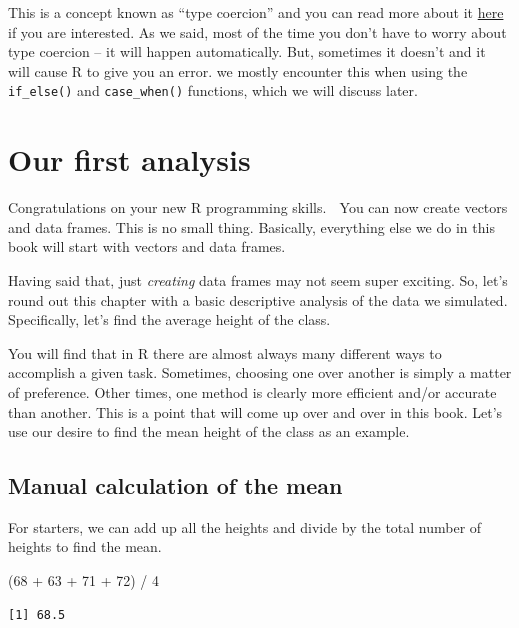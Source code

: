 \documentclass[
  letterpaper,
  DIV=11,
  numbers=noendperiod]{scrreprt}
\newenvironment{Shaded}{\begin{snugshade}}{\end{snugshade}}
\newcommand{\DecValTok}[1]{\textcolor[rgb]{0.68,0.00,0.00}{#1}}
\newcommand{\NormalTok}[1]{\textcolor[rgb]{0.00,0.23,0.31}{#1}}
\newcommand{\SpecialCharTok}[1]{\textcolor[rgb]{0.37,0.37,0.37}{#1}}
\begin{document}
This is a concept known as ``type coercion'' and you can read more about
it \href{https://r4ds.had.co.nz/vectors.html\#coercion}{here} if you are
interested. As we said, most of the time you don't have to worry about
type coercion -- it will happen automatically. But, sometimes it doesn't
and it will cause R to give you an error. we mostly encounter this when
using the \texttt{if\_else()} and \texttt{case\_when()} functions, which
we will discuss later.

\section{Our first analysis}\label{our-first-analysis}

Congratulations on your new R programming skills. 🎉 You can now create
vectors and data frames. This is no small thing. Basically, everything
else we do in this book will start with vectors and data frames.

Having said that, just \emph{creating} data frames may not seem super
exciting. So, let's round out this chapter with a basic descriptive
analysis of the data we simulated. Specifically, let's find the average
height of the class.

You will find that in R there are almost always many different ways to
accomplish a given task. Sometimes, choosing one over another is simply
a matter of preference. Other times, one method is clearly more
efficient and/or accurate than another. This is a point that will come
up over and over in this book. Let's use our desire to find the mean
height of the class as an example.

\subsection{Manual calculation of the
mean}\label{manual-calculation-of-the-mean}

For starters, we can add up all the heights and divide by the total
number of heights to find the mean.

\begin{Shaded}
\begin{Highlighting}[]
\NormalTok{(}\DecValTok{68} \SpecialCharTok{+} \DecValTok{63} \SpecialCharTok{+} \DecValTok{71} \SpecialCharTok{+} \DecValTok{72}\NormalTok{) }\SpecialCharTok{/} \DecValTok{4}
\end{Highlighting}
\end{Shaded}

\begin{verbatim}
[1] 68.5
\end{verbatim}
\end{document}
